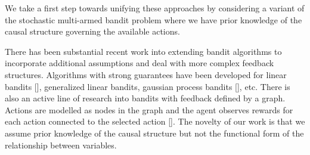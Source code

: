 We take a first step towards unifying these approaches by considering a variant of the stochastic multi-armed bandit problem where we have prior knowledge of the causal structure governing the available actions. 






There has been substantial recent work into extending bandit algorithms to incorporate additional assumptions and deal with more complex feedback structures. Algorithms with strong guarantees have been developed for linear bandits [], generalized linear bandits, gaussian process bandits [], etc. There is also an active line of research into bandits with feedback defined by a graph. Actions are modelled as nodes in the graph and the agent observes rewards for each action connected to the selected action []. The novelty of our work is that we assume prior knowledge of the causal structure but not the functional form of the relationship between variables.   

